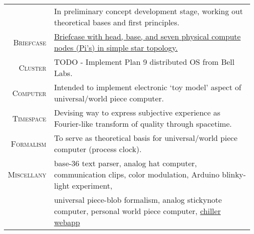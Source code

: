 \documentclass[letter,11pt]{article}
\begin{document}
\begin{center}
{\begin{tabular}{r|l}
	&	\scriptsize{In preliminary concept development stage, working out theoretical bases and first principles.}
	\\

\addlinespace[8pt]

		\textsc{Briefcase}
	&	\href{https://github.com/blairmunroakusa/portfolio/tree/master/briefcaseCluster}{\scriptsize{Briefcase with head, base, and seven physical compute nodes (Pi's) in simple star topology.}}
	\\
		\textsc{Cluster}
	&	\scriptsize{TODO - Implement Plan 9 distributed OS from Bell Labs.}
	\\
		\textsc{Computer}
	&	\scriptsize{Intended to implement electronic `toy model' aspect of universal/world piece computer.}
	\\

\addlinespace[8pt]

		\textsc{Timespace}
	&	\scriptsize{Devising way to express subjective experience as Fourier-like transform of quality through spacetime.}
	\\
		\textsc{Formalism}
	&	\scriptsize{To serve as theoretical basis for universal/world piece computer (process clock).}
	\\

\addlinespace[8pt]

		\textsc{Miscellany}
	&	\scriptsize{base-36 text parser, analog hat computer, communication clips, color modulation, Arduino blinky-light experiment,}
	\\

	&	\scriptsize{universal piece-blob formalism, analog stickynote computer, personal world piece computer, \href{https://chiller.blairmunroakusa.wp.computer}{chiller webapp}}
	\\

\end{tabular}

}
\end{center}
\end{document}
